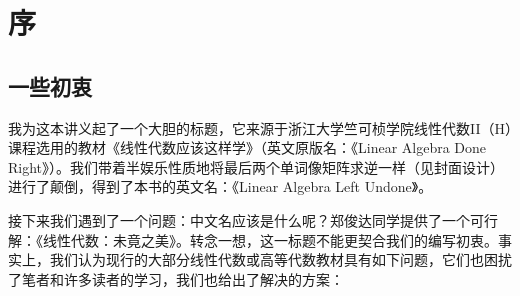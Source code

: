 \chapter*{序}

\section*{一些初衷}

我为这本讲义起了一个大胆的标题，它来源于浙江大学竺可桢学院线性代数II（H）课程选用的教材《线性代数应该这样学》（英文原版名：《Linear Algebra Done Right》）。我们带着半娱乐性质地将最后两个单词像矩阵求逆一样（见封面设计）进行了颠倒，得到了本书的英文名：《Linear Algebra Left Undone》。

接下来我们遇到了一个问题：中文名应该是什么呢？郑俊达同学提供了一个可行解：《线性代数：未竟之美》。转念一想，这一标题不能更契合我们的编写初衷。事实上，我们认为现行的大部分线性代数或高等代数教材具有如下问题，它们也困扰了笔者和许多读者的学习，我们也给出了解决的方案：
